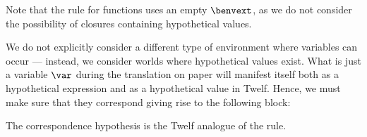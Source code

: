 Note that the rule for functions uses an empty $\benvext$, as we do not consider the possibility of closures containing hypothetical values.

\Twelf
We do not explicitly consider a different type of environment where variables can occur --- instead, we consider worlds where hypothetical values exist.
What is just a variable $\var$ during the translation on paper will manifest itself both as a hypothetical \hlang expression and as a hypothetical \blang value in Twelf.
Hence, we must make sure that they correspond giving rise to the following block:

The correspondence hypothesis is the Twelf analogue of the  rule.
